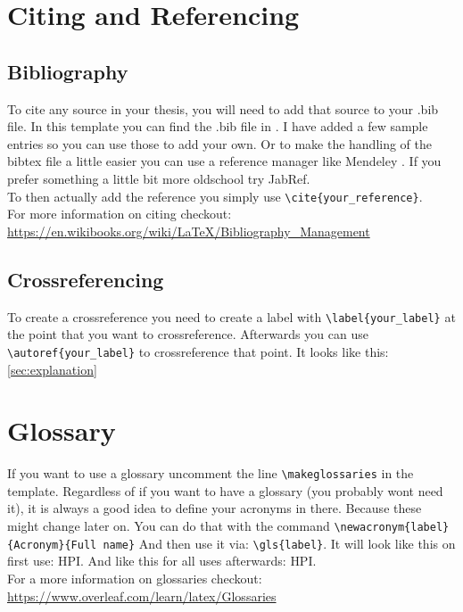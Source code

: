 \section{Citing and Referencing}

\subsection{Bibliography}
\cite[p.~341-348]{Hutchison1973}
To cite any source in your thesis, you will need to add that source to your .bib file.
In this template you can find the .bib file in .
I have added a few sample entries so you can use those to add your own.
Or to make the handling of the bibtex file a little easier you can use a reference manager like Mendeley \cite{mendeley}.
If you prefer something a little bit more oldschool try JabRef.\\
To then actually add the reference you simply use \verb|\cite{your_reference}|.\\
For more information on citing checkout: \url{https://en.wikibooks.org/wiki/LaTeX/Bibliography_Management}

\subsection{Crossreferencing}
To create a crossreference you need to create a label with \verb|\label{your_label}| at the point that you want to crossreference. Afterwards you can use \verb|\autoref{your_label}| to crossreference that point. It looks like this: \autoref{sec:explanation} 

\section{Glossary}
If you want to use a glossary uncomment the line \verb|\makeglossaries| in the template.
Regardless of if you want to have a glossary (you probably wont need it), it is always a good idea to define your acronyms in there.
Because these might change later on.
You can do that with the command \verb|\newacronym{label}{Acronym}{Full name}| And then use it via: \verb|\gls{label}|. It will look like this on first use: \gls{HPI}. And like this for all uses afterwards: \gls{HPI}.\\

For a more information on glossaries checkout: \url{https://www.overleaf.com/learn/latex/Glossaries}


